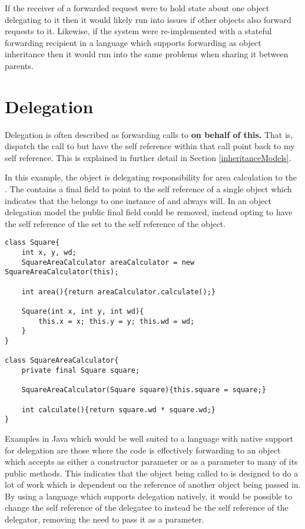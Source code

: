 If the receiver of a forwarded request were to hold state about one object delegating to it then it would likely run into issues if other objects also forward requests to it. Likewise, if the system were re-implemented with a stateful forwarding recipient in a language which supports forwarding as object inheritance then it would run into the same problems when sharing it between parents.

\section{Delegation}
\label{sec:delegation}
Delegation is often described as forwarding  calls to  \textbf{on behalf of this.} That is, dispatch the call to  but have the self reference within that call point back to my self reference. This is explained in further detail in Section \ref{inheritanceModels}.
\newline

In this example, the  object is delegating responsibility for area calculation to the . The  contains a final field to point to the self reference of a single  object which indicates that the  belongs to one instance of  and always will. In an object delegation model the public final field could be removed, instead opting to have the self reference of the  set to the self reference of the  object.
\begin{lstlisting}
class Square{
	int x, y, wd;
	SquareAreaCalculator areaCalculator = new SquareAreaCalculator(this);

	int area(){return areaCalculator.calculate();}

	Square(int x, int y, int wd){
		this.x = x; this.y = y; this.wd = wd;
	}
}

class SquareAreaCalculator{
	private final Square square;

	SquareAreaCalculator(Square square){this.square = square;}

	int calculate(){return square.wd * square.wd;}
}
\end{lstlisting}

Examples in Java which would be well suited to a language with native support for delegation are those where the code is effectively forwarding to an object which accepts  as either a constructor parameter or as a parameter to many of its public methods. This indicates that the object being called to is designed to do a lot of work which is dependent on the  reference of another object being passed in. By using a language which supports delegation natively, it would be possible to change the self reference of the delegatee to instead be the self reference of the delegator, removing the need to pass it as a parameter.

